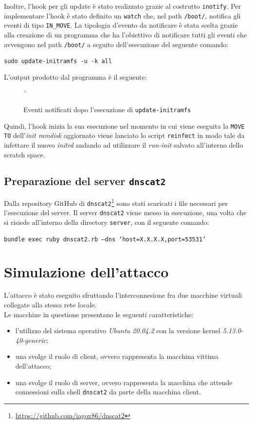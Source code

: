 \documentclass[oneside]{article}
\begin{document}
Inoltre, l'hook per gli update è stato realizzato grazie al costrutto \texttt{inotify}. Per implementare l'hook è stato definito un \texttt{watch} che, nel path \texttt{/boot/}, notifica gli eventi di tipo \texttt{IN\_MOVE}. La tipologia d'evento da notificare è stata scelta grazie alla creazione di un programma che ha l'obiettivo di notificare tutti gli eventi che avvengono nel path \texttt{/boot/} a seguito dell'esecuzione del seguente comando:
\begin{center}
\texttt{sudo update-initramfs -u -k all}
\end{center}
L'output prodotto dal programma è il seguente:
\begin{figure}[ht!]
\centering
{}˘
\caption{Eventi notificati dopo l'esecuzione di \texttt{update-initramfs}}
\end{figure}

\newpage
Quindi, l'hook inizia la sua esecuzione nel momento in cui viene eseguita la \texttt{MOVE TO} dell'\textit{init ramdisk} aggiornato viene lanciato lo script \texttt{reinfect} in modo tale da infettare il nuovo \textit{initrd} andando ad utilizzare il \textit{run-init} salvato all'interno dello scratch space.

\subsection{Preparazione del server \texttt{dnscat2}}
Dalla repository GitHub di \texttt{dnscat2}\footnote{\url{https://github.com/iagox86/dnscat2}} sono stati scaricati i file necessari per l'esecuzione del server. Il server \texttt{dnscat2} viene messo in esecuzione, una volta che si risiede all'interno della directory \texttt{server}, con il seguente comando:
\begin{center}
\texttt{bundle exec ruby dnscat2.rb --dns `host=X.X.X.X,port=53531'}
\end{center}

\section{Simulazione dell'attacco}
L'attacco è stato eseguito sfruttando l'interconnesione fra due macchine virtuali collegate alla stessa rete locale.\\ Le macchine in questione presentano le seguenti caratteristiche: 
\begin{itemize}
\item l'utilizzo del sistema operativo \textit{Ubuntu 20.04.2} con la versione kernel \textit{5.13.0-40-generic};
\item una svolge il ruolo di client, ovvero rappresenta la macchina vittima dell'attacco;
\item una svolge il ruolo di server, ovvero rappresenta la macchina che attende connessioni sulla shell \texttt{dnscat2} da parte della macchina client.
\end{itemize}
\end{document}
